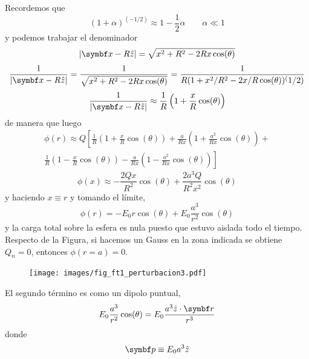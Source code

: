 \documentclass[10pt,oneside]{CBFT_book}
\begin{document}
Recordemos que
\[
	(1+\alpha)^{(-1/2)} \approx 1 - \frac{1}{2}\alpha \qquad \alpha \ll 1
\]
y podemos trabajar el denominador
\[
	|\vb{x} - R\hat{z}| = \sqrt{ x^2 + R^2 - 2Rx\cos(\theta)}
\]
\[
	\frac{1}{|\vb{x} - R\hat{z}|} = \frac{1}{\sqrt{ x^2 + R^2 - 2Rx\cos(\theta)}} =
	\frac{1}{R(1 + x^2/R^2 - 2x/R\cos(\theta))^(1/2)}
\]
\[
	\frac{1}{|\vb{x} - R\hat{z}|} \approx \frac{1}{R}\left(1+ \frac{x}{R} \cos(\theta) \right)
\]
de manera que luego
\begin{multline*}
	\phi(r) \approx Q\left[ \frac{1}{R}\left(1+ \frac{x}{R} \cos(\theta) \right) + 
	\frac{a}{Rx}\left(1+ \frac{a^2}{Rx} \cos(\theta) \right) + \right. \\
	\left. \frac{1}{R}\left(1 - \frac{x}{R} \cos(\theta) \right) -
	\frac{a}{Rx}\left(1 - \frac{a^2}{Rx} \cos(\theta) \right) \right]
\end{multline*}
\[
	\phi(x) \approx -\frac{2Qx}{R^2} \cos(\theta) + \frac{2a^3Q}{R^2x^2}\cos(\theta)
\]
y haciendo $x\equiv r$ y tomando el límite,
\[
	\phi(r) = -E_0 r \cos(\theta) + E_0\frac{a^3}{r^2} \cos(\theta)
\]
y la carga total sobre la esfera es nula puesto que estuvo aislada todo el tiempo.
Respecto de la Figura, si hacemos un Gauss en la zona indicada se obtiene $Q_n=0$,
entonces $\phi(r=a)=0$.

\begin{figure}[htb]
	\begin{center}
	\texttt{[image: images/fig\_ft1\_perturbacion3.pdf]}	 
	\end{center}
	\caption{}
\end{figure}

El segundo término es como un dipolo puntual,
\[
	E_0\frac{a^3}{r^2} \cos(\theta) = E_0\frac{a^3 \hat{z}\cdot\vb{r}}{r^3} 
\]
donde
\[
	\vb{p} \equiv E_0 a^3 \hat{z}
\]





\end{document}

